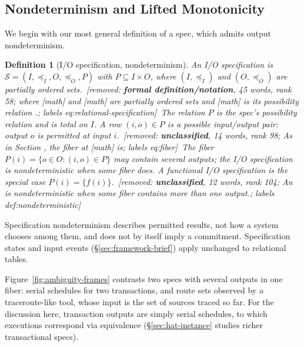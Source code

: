 \documentclass[sigconf]{cidr-2027}
\newtheorem{definition}{Definition}
\theoremstyle{remark}
\newcommand{\InputOrd}{\preceq_I}
\newcommand{\OutputOrd}{\preceq_O}
\newcommand{\commitment}{commitment\xspace}
\newcommand{\Spec}{\mathcal{S}}
\newcommand{\spectype}[1][]{I/O specification#1\xspace}
\newcommand{\Spectype}[1][]{I/O specification#1\xspace}
\newcommand{\fiber}[1]{P(#1)}
\newif\ifshowrv \showrvfalse
\newcommand{\rv}[1]{\ifshowrv\textsuperscript{\textcolor{magenta}{\textbf{R#1}}}\fi}
\newcommand{\removednote}[1]{{\color{cutred}\footnotesize\,[removed: #1]\,}}
\begin{document}
\subsection{Nondeterminism and Lifted Monotonicity}
\label{sec:ambiguity-story}
\label{sec:relational-specifications}
\label{sec:lifted-monotonicity}

\textcolor{newblue}{We begin with our most general definition of a spec, which admits
output nondeterminism.}
\begin{definition}[\Spectype, nondeterminism]
\label{def:relational-specification}
\textcolor{newblue}{An \emph{\spectype} is
$\Spec=(I,\InputOrd,O,\OutputOrd,P)$ with $P\subseteq I\times O$,
where $(I,\InputOrd)$ and $(O,\OutputOrd)$ are partially ordered sets.} \removednote{\textbf{formal definition/notation}, 45 words, rank 58; \textit{where [math] and [math] are partially ordered sets and [math] is its possibility relation .}; labels eq:relational-specification} \textcolor{newblue}{The
relation $P$ is the spec's \emph{possibility relation} and is total
on $I$.} A row $(i,o)\in P$ is a possible input/output pair: output $o$ is
permitted at input $i$. \removednote{\textbf{unclassified}, 14 words, rank 98; \textit{As in Section , the fiber at [math] is}; labels eq:fiber} \textcolor{newblue}{The fiber
$\fiber{i}=\{o\in O:(i,o)\in P\}$ may contain several
outputs; the \spectype is \emph{nondeterministic} when some fiber does.} A
functional \spectype is the special case $\fiber{i}=\{f(i)\}$. \removednote{\textbf{unclassified}, 12 words, rank 104; \textit{An is nondeterministic when some fiber contains more than one output.}; labels def:nondeterministic}
\end{definition}

\textcolor{newblue}{Specification nondeterminism describes permitted results, not how a system chooses\rv{14}
among them, and does not by itself imply a \commitment.} \textcolor{newblue}{Specification states and input events
(\S\ref{sec:framework-brief}) apply unchanged to relational tables.}

\textcolor{newblue}{Figure~\ref{fig:ambiguity-frames} contrasts two specs with several outputs
in one fiber: serial schedules for two transactions, and route sets observed by a
traceroute-like tool, whose input is the set of sources traced so far.} \textcolor{newblue}{For the discussion here, transaction outputs are simply
serial schedules, to which executions correspond via equivalence (\S\ref{sec:hat-instance} studies richer transactional specs).}
\end{document}
